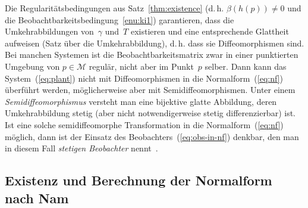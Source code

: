 \begin{remark}
\label{rem:stetige-Beobachter}Die Regularitätsbedingungen aus Satz~\ref{thm:existence}
(d.\,h. $\beta(h(p))\neq0$ und die Beobachtbarkeitsbedingung~\ref{enu:ki1})
garantieren, dass die Umkehrabbildungen von~$\gamma$ und~$T$ existieren
und eine entsprechende Glattheit aufweisen (Satz über die Umkehrabbildung),
d.\,h. dass sie Diffeomorphismen sind. Bei manchen Systemen ist die
Beobachtbarkeitsmatrix zwar in einer punktierten Umgebung von $p\in\mathcal{M}$
regulär, nicht aber im Punkt~$p$ selber. Dann kann das System~(\ref{eq:plant})
nicht mit Diffeomorphismen in die Normalform~(\ref{eq:nf}) überführt
werden, möglicherweise aber mit Semidiffeomorphismen. Unter einem
\emph{Semidiffeomorphismus} versteht
man eine bijektive glatte Abbildung, deren
Umkehrabbildung stetig (aber nicht notwendigerweise stetig differenzierbar)
ist. Ist eine solche semidiffeomorphe Transformation in die Normalform~(\ref{eq:nf})
möglich, dann ist der Einsatz des Beobachters~(\ref{eq:obs-in-nf})
denkbar, den man in diesem Fall \emph{stetigen Beobachter}
nennt~\cite{xia97,zeitz98,schaffner99}.
\end{remark}


\subsection{Existenz und Berechnung der Normalform nach Nam\label{subsec:Berechnung-nach-Nam}}

